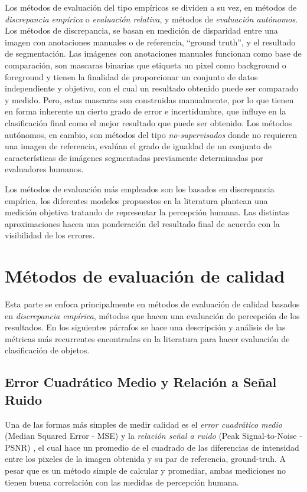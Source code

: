 Los métodos de evaluación del tipo empíricos se dividen a su vez, en métodos de \emph{discrepancia empírica} o \emph{evaluación relativa}, y métodos de \emph{evaluación autónomos}. Los métodos de discrepancia, se basan en medición de disparidad entre una imagen con anotaciones manuales o de referencia, ``ground truth'', y el resultado de segmentación. Las imágenes con anotaciones manuales funcionan como base de comparación, son mascaras binarias que etiqueta un pixel como background o foreground y tienen la finalidad de proporcionar un conjunto de datos independiente y objetivo, con el cual un resultado obtenido puede ser comparado y medido. Pero, estas mascaras son construidas manualmente, por lo que tienen en forma inherente un cierto grado de error e incertidumbre, que influye en la clasificación final como el mejor resultado que puede ser obtenido. Los métodos autónomos, en cambio, son métodos del tipo \emph{no-supervisados} \cite{zhang_image_2008} donde no requieren una imagen de referencia, evalúan el grado de igualdad de un conjunto de características de imágenes segmentadas previamente determinadas por evaluadores humanos.

Los métodos de evaluación más empleados son los basados en discrepancia empírica, los diferentes modelos propuestos en la literatura plantean una medición objetiva tratando de representar la percepción humana. Las distintas aproximaciones hacen una ponderación del resultado final de acuerdo con la visibilidad de los errores.



\section{Métodos de evaluación de calidad}

Esta parte se enfoca principalmente en métodos de evaluación de calidad basados en \emph{discrepancia empírica}, métodos que hacen una evaluación de percepción de los resultados. En los siguientes párrafos se hace una descripción y análisis de las métricas más recurrentes encontradas en la literatura para hacer evaluación de clasificación de objetos. 

\subsection{Error Cuadrático Medio y Relación a Señal Ruido}

Una de las formas más simples de medir calidad es el \emph{error cuadrático medio} (Median Squared Error - MSE) y la \emph{relación señal a ruido} (Peak Signal-to-Noise - PSNR) \cite{furht_handbook_2003} \cite{park_benchmark_2013}, el cual hace un promedio de el cuadrado de las diferencias de intensidad entre los pixeles de la imagen obtenida y su par de referencia, ground-truh. A pesar que es un método simple de calcular y promediar, ambas mediciones no tienen buena correlación con las medidas de percepción humana.

